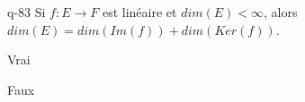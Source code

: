 \begin{truefalse}{q-83}
Si $f : E \to F$ est linéaire et $dim(E)<\infty$, alors $dim(E)=dim(Im(f))+dim(Ker(f))$.
\item* Vrai
\item Faux
\end{truefalse}

